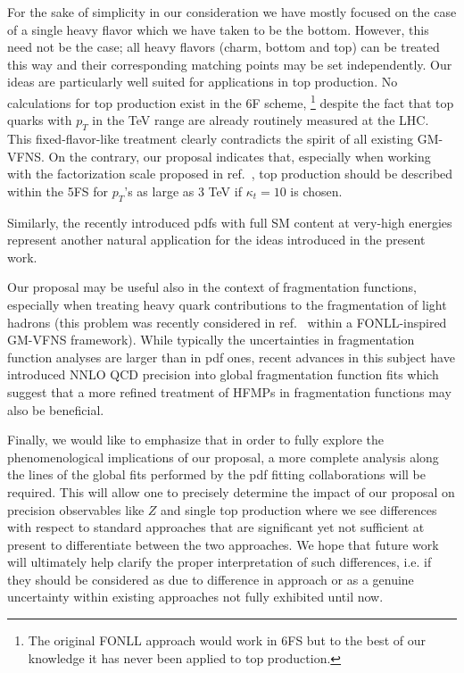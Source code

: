 \documentclass[letter,11pt]{article}
\begin{document}
For the sake of simplicity in our consideration we have mostly focused on the case of a single heavy flavor which we have taken to be the bottom. However, this need not be the case; all heavy flavors (charm, bottom and top) can be treated this way and their corresponding matching points may be set independently. Our ideas are particularly well suited for applications in top production. No calculations for top production exist in the 6F scheme,
%
\footnote{The original FONLL approach \cite{Cacciari:1998it} would work in 6FS but to the best of our knowledge it has never been applied to top production.}
%
despite the fact that top quarks with $p_T$ in the TeV range are already routinely measured at the LHC. This fixed-flavor-like treatment clearly contradicts the spirit of all existing GM-VFNS. On the contrary, our proposal indicates that, especially when working with the factorization scale proposed in ref.~\cite{Czakon:2016dgf}, top production should be described within the 5FS for $p_T$'s as large as 3 TeV if $\kappa_t=10$ is chosen. 

Similarly, the recently introduced pdfs with full SM content at very-high energies \cite{Bauer:2017isx} represent another natural application for the ideas introduced in the present work.

Our proposal may be useful also in the context of fragmentation functions, especially when treating heavy quark contributions to the fragmentation of light hadrons (this problem was recently considered in ref.~\cite{Epele:2016gup} within a FONLL-inspired GM-VFNS framework). While typically the uncertainties in fragmentation function analyses are larger than in pdf ones, recent advances in this subject have introduced NNLO QCD precision into global fragmentation function fits \cite{Anderle:2015lqa,Bertone:2017tyb} which suggest that a more refined treatment of HFMPs in fragmentation functions may also be beneficial.

Finally, we would like to emphasize that in order to fully explore the phenomenological implications of our proposal, a more complete analysis along the lines of the global fits performed by the pdf fitting collaborations will be required. This will allow one to precisely determine the impact of our proposal on precision observables like $Z$ and single top production where we see differences with respect to standard approaches that are significant yet not sufficient at present to differentiate between the two approaches. We hope that future work will ultimately help clarify the proper interpretation of such differences, i.e. if they should be considered as due to difference in approach or as a genuine uncertainty within existing approaches not fully exhibited until now.
\end{document}
